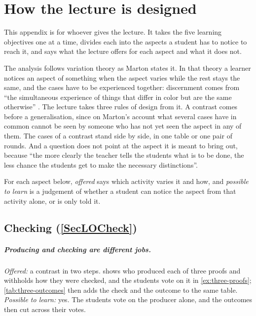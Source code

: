 
\chapter{How the lecture is designed}
\label{app:design}

This appendix is for whoever gives the lecture.
It takes the five learning objectives one at a time, divides each into
the aspects a student has to notice to reach it, and says what the
lecture offers for each aspect and what it does not.

The analysis follows variation theory as Marton states it.
In that theory a learner notices an aspect of something when the aspect
varies while the rest stays the same, and the cases have to be
experienced together: discernment comes from \enquote{the simultaneous
experience of things that differ in color but are the same otherwise}%
\autocite[46]{Marton2015}.
The lecture takes three rules of design from it.
A contrast comes before a generalisation, since on Marton's account what
several cases have in common cannot be seen by someone who has not yet
seen the aspect in any of them\autocite[46--47]{Marton2015}.
The cases of a contrast stand side by side, in one table or one pair of
rounds.
And a question does not point at the aspect it is meant to bring out,
because \enquote{the more clearly the teacher tells the students what is
to be done, the less chance the students get to make the necessary
distinctions}\autocite[13]{Marton2015}.

For each aspect below, \emph{offered} says which activity varies it and
how, and \emph{possible to learn} is a judgement of whether a student
can notice the aspect from that activity alone, or is only told it.


\section{Checking (\cref{SecLOCheck})}
\label{sec:design-check}

\SecLOCheck*

\paragraph{Producing and checking are different jobs.}
\emph{Offered:} a contrast in two steps.
 shows who produced each of three proofs
and withholds how they were checked, and the students vote on it in
\cref{ex:three-proofs}; \cref{tab:three-outcomes} then adds the
check and the outcome to the same table.
\emph{Possible to learn:} yes.
The students vote on the producer alone, and the outcomes then cut
across their votes.
